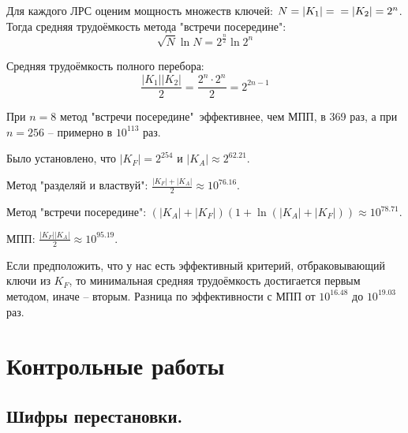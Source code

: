 \documentclass[letterpaper,11pt,openany]{book}
\begin{document}
Для каждого ЛРС оценим мощность множеств ключей: $N = |K_1| = \\ = |K_2| = 2^n$.
Тогда средняя трудоёмкость метода "встречи посередине":
$$\sqrt N \ln N = 2^{\frac{n}{2}} \ln 2^{n}$$

\noindent Средняя трудоёмкость полного перебора: 
$$\frac{|K_1||K_2|}{2} = \frac{2^{n} \cdot 2^{n}}{2} = 2^{2n-1}$$

При $n = 8$ метод "встречи посередине"\ эффективнее, чем МПП, в 369 раз, а при $n = 256$ -- примерно в $10^{113}$ раз.


\noindent Было установлено, что $|K_F| = 2^{254}$ и $|K_A| \approx 2^{62.21}$.

\noindent Метод "разделяй и властвуй": $\frac{|K_F| + |K_A|}{2} \approx 10 ^ {76.16}$.

\noindent Метод "встречи посередине": $(|K_A| + |K_F|)(1 + \ln(|K_A| + |K_F|)) \approx 10 ^ {78.71} $.

\noindent МПП: $\frac{|K_F||K_A|}{2} \approx 10 ^ {95.19}$.

\noindent Если предположить, что у нас есть эффективный критерий, отбраковывающий ключи из $K_F$, то минимальная средняя трудоёмкость достигается первым методом, иначе -- вторым. Разница по эффективности с МПП от $10 ^ {16.48}$ до $10 ^ {19.03}$ раз.

\newpage
\chapter{Контрольные работы}
\section{Шифры перестановки.}
\end{document}
